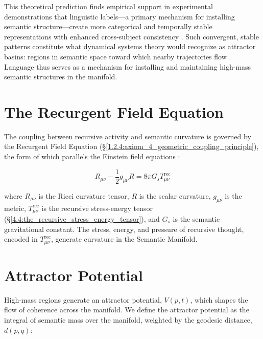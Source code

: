 This theoretical prediction finds empirical support in experimental demonstrations that linguistic labels—a primary mechanism for installing semantic structure—create more categorical and temporally stable representations with enhanced cross-subject consistency \autocite{LupyanThompsonSchill2012}. Such convergent, stable patterns constitute what dynamical systems theory would recognize as attractor basins: regions in semantic space toward which nearby trajectories flow \autocite{LupyanAbdelRahmanBoroditskyClark2020}. Language thus serves as a mechanism for installing and maintaining high-mass semantic structures in the manifold.


\section{The Recurgent Field Equation}
\label{5.3:the_recurgent_field_equation}

The coupling between recursive activity and semantic curvature is governed by the Recurgent Field Equation (\S\ref{1.2.4:axiom_4_geometric_coupling_principle}), the form of which parallels the Einstein field equations \autocite{Einstein1915, MisnerThorneWheeler1973, Wald1984}:

\begin{equation}
R_{\mu\nu} - \frac{1}{2}g_{\mu\nu}R = 8\pi G_s T^{\text{rec}}_{\mu\nu}
\end{equation}

where \(R_{\mu\nu}\) is the Ricci curvature tensor, \(R\) is the scalar curvature, \(g_{\mu\nu}\) is the metric, \(T^{\text{rec}}_{\mu\nu}\) is the recursive stress-energy tensor (\S\ref{4.4:the_recursive_stress_energy_tensor}), and \(G_s\) is the semantic gravitational constant. The stress, energy, and pressure of recursive thought, encoded in \(T^{\text{rec}}_{\mu\nu}\), generate curvature in the Semantic Manifold.


\section{Attractor Potential}
\label{5.4:attractor_potential}

High-mass regions generate an attractor potential, \(V(p,t)\), which shapes the flow of coherence across the manifold. We define the attractor potential as the integral of semantic mass over the manifold, weighted by the geodesic distance, \(d(p, q)\):

